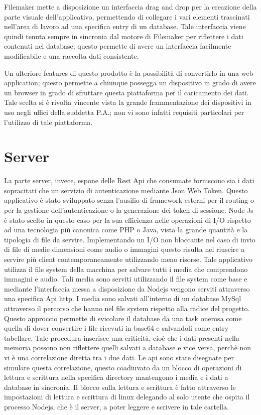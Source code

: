 Filemaker mette a disposizione un interfaccia drag and drop per la creazione della parte visuale dell'applicativo, permettendo di collegare i vari elementi trascinati nell'area di lavoro ad una specifica entry di un database. Tale interfaccia viene quindi tenuta sempre in sincronia dal motore di Filemaker per riflettere i dati contenuti nel database; questo permette di avere un interfaccia facilmente modificabile e una raccolta dati consistente.\vspace{5mm}

Un ulteriore features di questo prodotto è la possibilità di convertirlo in una web application; questo permette a chiunque possegga un dispositivo in grado di avere un browser in grado di sfruttare questa piattaforma per il caricamento dei dati. Tale scelta si è rivolta vincente vista la grande frammentazione dei dispositivi in uso negli uffici della suddetta P.A.; non vi sono infatti requisiti particolari per l'utilizzo di tale piattaforma.

\section{Server}\vspace{5mm}
	
La parte server, invece, espone delle Rest Api che consumate forniscono sia i dati sopracitati che un servizio di autenticazione mediante Json Web Token. Questo applicativo è stato sviluppato senza l’ausilio di framework esterni per il routing o per la gestione dell’autenticazione o la generazione dei token di sessione. Node Js è stato scelto in questo caso per la sua efficienza nelle operazioni di I/O rispetto ad una tecnologia più canonica come PHP o Java, vista la grande quantità e la tipologia di file da servire. Implementando un I/O non bloccante\cite{BlockingVsNonBlocking} nel caso di invio di file di medie dimensioni come audio o immagini questo risulta nel riuscire a servire più client contemporaneamente utilizzando meno risorse. Tale applicativo utilizza il file system della macchina per salvare tutti i media che comprendono immagini e audio. Tali media sono serviti utilizzando il file system come base e mediante l'interfaccia messa a disposizione da Nodejs vengono serviti attraverso una specifica Api http. I media sono salvati all'interno di un database MySql attraverso il percorso che hanno nel file system rispetto alla radice del progetto. Questo approccio permette di svicolare il database da una task onerosa come quella di dover convertire i file ricevuti in base64 e salvandoli come entry tabellare. Tale procedura inserisce una criticità, cioè che i dati presenti nella memoria possono non riflettere quelli salvati a database e vice versa, perchè non vi è una correlazione diretta tra i due dati. Le api sono state disegnate per simulare questa correlazione, questo coadiuvato da un blocco di operazioni di lettura e scrittura nella specifica directory mantengono i media e i dati a database in sincronia. Il blocco sulla lettura e scrittura è fatto attraverso le impostazioni di lettura e scrittura di linux delegando al solo utente che ospita il processo Nodejs, che è il server, a poter leggere e scrivere in tale cartella.\vspace{5mm}

